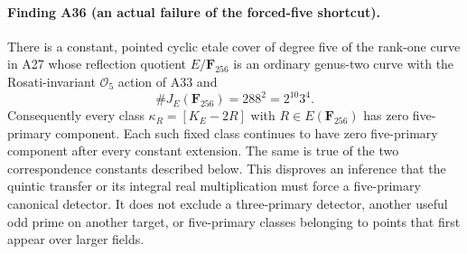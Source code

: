 \documentclass[11pt,a4paper]{article}
\begin{document}
\paragraph{Finding A36 (an actual failure of the forced-five shortcut).}
There is a constant, pointed cyclic etale cover of degree five of the
rank-one curve in A27 whose reflection quotient $E/\mathbf F_{256}$
is an ordinary genus-two curve with the Rosati-invariant
$\mathcal O_5$ action of A33 and
\[
 \#J_E(\mathbf F_{256})=288^2=2^{10}3^4.
 \tag{NF.1}
\]
Consequently every class $\kappa_R=[K_E-2R]$ with
$R\in E(\mathbf F_{256})$ has zero five-primary component.
Each such fixed class continues to have zero five-primary component
after every constant extension. The same is true of the two
correspondence constants described below. This disproves an inference
that the quintic transfer or its integral real multiplication must
force a five-primary canonical detector. It does not exclude a
three-primary detector, another useful odd prime on another target,
or five-primary classes belonging to points that first appear over
larger fields.
\end{document}
